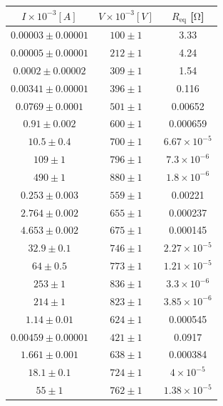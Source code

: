 \documentclass[a4paper]{article}
\begin{document}
\begin{center}
\begin{tabular}{|c|c|c|}
\hline
$I \times 10^{-3}[A]$ & $V \times 10^{-3}[V]$ & $R_{\text{eq}}$ [$\si{\ohm}$]\\
\hline
$0.00003 \pm 0.00001$ & $100 \pm 1$ & 3.33 \\
$0.00005 \pm 0.00001$ & $212 \pm 1$ & 4.24 \\
$0.0002 \pm 0.00002$ & $309 \pm 1$ & 1.54 \\
$0.00341 \pm 0.00001$ & $396 \pm 1$ & 0.116 \\
$0.0769 \pm 0.0001$ & $501 \pm 1$ & 0.00652 \\
$0.91 \pm 0.002$ & $600 \pm 1$ & 0.000659 \\
$10.5 \pm 0.4$ & $700 \pm 1$ & $6.67 \times 10^{-5}$ \\
$109 \pm 1$ & $796 \pm 1$ & $7.3 \times 10^{-6}$ \\
$490 \pm 1$ & $880 \pm 1$ & $1.8 \times 10^{-6}$ \\
$0.253 \pm 0.003$ & $559 \pm 1$ & 0.00221 \\
$2.764 \pm 0.002$ & $655 \pm 1$ & 0.000237 \\
$4.653 \pm 0.002$ & $675 \pm 1$ & 0.000145 \\
$32.9 \pm 0.1$ & $746 \pm 1$ & $2.27 \times 10^{-5}$ \\
$64 \pm 0.5$ & $773 \pm 1$ & $1.21 \times 10^{-5}$ \\
$253 \pm 1$ & $836 \pm 1$ & $3.3 \times 10^{-6}$ \\
$214 \pm 1$ & $823 \pm 1$ & $3.85 \times 10^{-6}$ \\
$1.14 \pm 0.01$ & $624 \pm 1$ & 0.000545 \\
$0.00459 \pm 0.00001$ & $421 \pm 1$ & 0.0917 \\
$1.661 \pm 0.001$ & $638 \pm 1$ & 0.000384 \\
$18.1 \pm 0.1$ & $724 \pm 1$ & $4 \times 10^{-5}$ \\
$55 \pm 1$ & $762 \pm 1$ & $1.38 \times 10^{-5}$ \\
\hline
\end{tabular}
\end{center}
\end{document}
